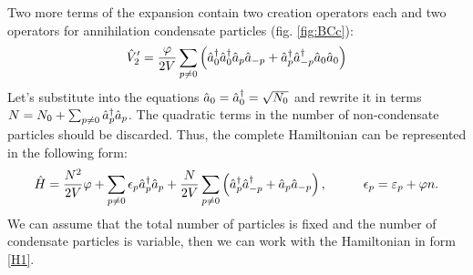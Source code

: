 

Two more terms of the expansion contain two creation operators each
and two operators for annihilation condensate particles (fig. \ref{fig:BCc}):
\begin{equation*}
	\hat{V}_2' = \frac{\varphi}{2V} \sum_{p \neq 0} \left(
		\hat{a}^{\dag}_0 \hat{a}^{\dag}_0 \hat{a}_p \hat{a}_{-p} + \hat{a}^{\dag}_p \hat{a}^{\dag}_{-p} \hat{a}_0  \hat{a}_0
	\right)
\end{equation*}
Let's substitute into the equations $\hat{a}_0 = \hat{a}_0^{\dag} = \sqrt{N_0}$ and rewrite it in terms $N = N_0 + \sum_{p \neq 0} \hat{a}_p^{\dag} \hat{a}_p$. The quadratic terms in the number of non-condensate particles should be discarded. Thus, the complete Hamiltonian can be represented in the following form:
\begin{equation}
	\hat{H} = \frac{N^2}{2V}\varphi  + \sum_{p \neq 0} \epsilon_p \hat{a}_p\D \hat{a}_p + \frac{N}{2V} \sum_{p \neq 0} \left(\hat{a}\D_p \hat{a}\D_{-p} + \hat{a}_p \hat{a}_{-p}\right),
	\hspace{10 mm} 
	\epsilon_p = \varepsilon_p + \varphi n.
	\label{H1}
\end{equation}
We can assume that the total number of particles is fixed and the number of condensate particles is variable, then we can work with the Hamiltonian in form \eqref{H1}. 

